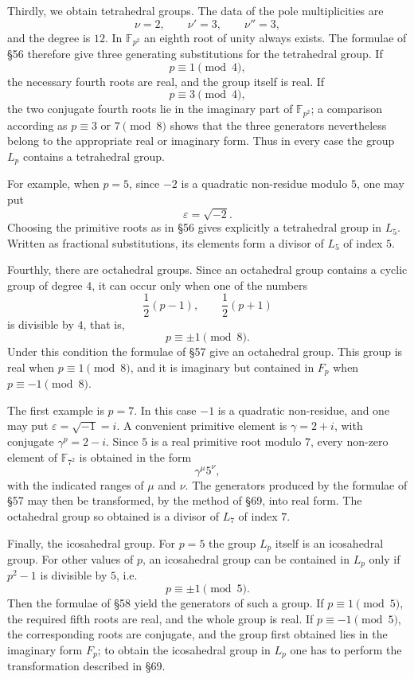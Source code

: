 \documentclass[11pt,a4paper]{book}
\newcommand{\F}{\mathbb F}
\begin{document}
Thirdly, we obtain tetrahedral groups.  The data of the pole multiplicities are
\[
 \nu=2,\qquad \nu'=3,\qquad \nu''=3,
\]
and the degree is \(12\).  In \(\F_{p^2}\) an eighth root of unity always exists.  The formulae of \S 56 therefore give three generating substitutions for the tetrahedral group.  If
\[
 p\equiv 1\pmod 4,
\]
the necessary fourth roots are real, and the group itself is real.  If
\[
 p\equiv 3\pmod 4,
\]
the two conjugate fourth roots lie in the imaginary part of \(\F_{p^2}\); a comparison according as \(p\equiv 3\) or \(7\pmod 8\) shows that the three generators nevertheless belong to the appropriate real or imaginary form.  Thus in every case the group \(L_p\) contains a tetrahedral group.

For example, when \(p=5\), since \(-2\) is a quadratic non-residue modulo \(5\), one may put
\[
 \varepsilon=\sqrt{-2}.
\]
Choosing the primitive roots as in \S 56 gives explicitly a tetrahedral group in \(L_5\).  Written as fractional substitutions, its elements form a divisor of \(L_5\) of index \(5\).

Fourthly, there are octahedral groups.  Since an octahedral group contains a cyclic group of degree \(4\), it can occur only when one of the numbers
\[
 \frac12(p-1),\qquad \frac12(p+1)
\]
is divisible by \(4\), that is,
\[
 p\equiv \pm1\pmod 8 .
\]
Under this condition the formulae of \S 57 give an octahedral group.  This group is real when \(p\equiv 1\pmod8\), and it is imaginary but contained in \(F_p\) when \(p\equiv -1\pmod8\).

The first example is \(p=7\).  In this case \(-1\) is a quadratic non-residue, and one may put \(\varepsilon=\sqrt{-1}=i\).  A convenient primitive element is \(\gamma=2+i\), with conjugate \(\gamma^p=2-i\).  Since \(5\) is a real primitive root modulo \(7\), every non-zero element of \(\F_{7^2}\) is obtained in the form
\[
 \gamma^\mu 5^\nu ,
\]
with the indicated ranges of \(\mu\) and \(\nu\).  The generators produced by the formulae of \S 57 may then be transformed, by the method of \S 69, into real form.  The octahedral group so obtained is a divisor of \(L_7\) of index \(7\).

Finally, the icosahedral group.  For \(p=5\) the group \(L_p\) itself is an icosahedral group.  For other values of \(p\), an icosahedral group can be contained in \(L_p\) only if \(p^2-1\) is divisible by \(5\), i.e.
\[
 p\equiv \pm1\pmod5.
\]
Then the formulae of \S 58 yield the generators of such a group.  If \(p\equiv1\pmod5\), the required fifth roots are real, and the whole group is real.  If \(p\equiv-1\pmod5\), the corresponding roots are conjugate, and the group first obtained lies in the imaginary form \(F_p\); to obtain the icosahedral group in \(L_p\) one has to perform the transformation described in \S 69.
\end{document}
